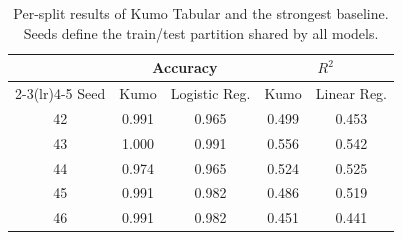 \begin{table}[t]
\centering
\caption{Per-split results of Kumo Tabular and the strongest baseline. Seeds define the train/test partition shared by all models.}
\label{tab:per_split}
\setlength{\tabcolsep}{4pt}
\begin{tabular}{ccccc}
\toprule
& \multicolumn{2}{c}{Accuracy} & \multicolumn{2}{c}{$R^2$} \\
\cmidrule(lr){2-3}\cmidrule(lr){4-5}
Seed & Kumo & Logistic Reg. & Kumo & Linear Reg. \\
\midrule
42 & 0.991 & 0.965 & 0.499 & 0.453 \\
43 & 1.000 & 0.991 & 0.556 & 0.542 \\
44 & 0.974 & 0.965 & 0.524 & 0.525 \\
45 & 0.991 & 0.982 & 0.486 & 0.519 \\
46 & 0.991 & 0.982 & 0.451 & 0.441 \\
\bottomrule
\end{tabular}
\end{table}
